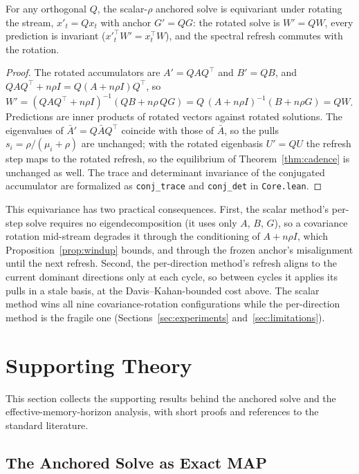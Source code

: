 \begin{proposition}
\label{prop:invariance}
For any orthogonal $Q$, the scalar-$\rho$ anchored solve is equivariant under rotating the stream, $x'_t = Qx_t$ with anchor $G' = QG$: the rotated solve is $W' = QW$, every prediction is invariant ($x'^\top_t W' = x^\top_t W$), and the spectral refresh commutes with the rotation.
\end{proposition}
\begin{proof}
The rotated accumulators are $A' = QAQ^\top$ and $B' = QB$, and $QAQ^\top + n\rho I = Q(A + n\rho I)Q^\top$, so
$W' = (QAQ^\top + n\rho I)^{-1}(QB + n\rho\,QG) = Q\,(A + n\rho I)^{-1}(B + n\rho G) = QW$.
Predictions are inner products of rotated vectors against rotated solutions.
The eigenvalues of $\bar A' = Q\bar A Q^\top$ coincide with those of $\bar A$, so the pulls $s_i = \rho/(\mu_i + \rho)$ are unchanged; with the rotated eigenbasis $U' = QU$ the refresh step maps to the rotated refresh, so the equilibrium of Theorem~\ref{thm:cadence} is unchanged as well.
The trace and determinant invariance of the conjugated accumulator are formalized as \texttt{conj\_trace} and \texttt{conj\_det} in \texttt{Core.lean}.
\end{proof}
This equivariance has two practical consequences. First, the scalar method's per-step solve requires no eigendecomposition (it uses only $A$, $B$, $G$), so a covariance rotation mid-stream degrades it through the conditioning of $A + n\rho I$, which Proposition~\ref{prop:windup} bounds, and through the frozen anchor's misalignment until the next refresh. Second, the per-direction method's refresh aligns to the current dominant directions only at each cycle, so between cycles it applies its pulls in a stale basis, at the Davis--Kahan-bounded cost above. The scalar method wins all nine covariance-rotation configurations while the per-direction method is the fragile one (Sections~\ref{sec:experiments} and~\ref{sec:limitations}).

\section{Supporting Theory}
\label{app:support}

This section collects the supporting results behind the anchored solve and the effective-memory-horizon analysis, with short proofs and references to the standard literature.

\subsection{The Anchored Solve as Exact MAP}
\label{app:support-map}


